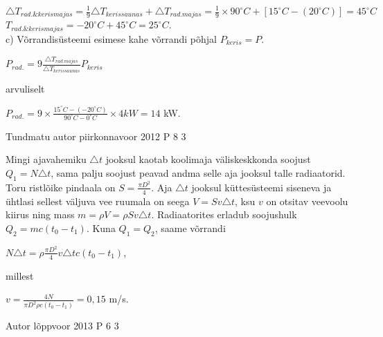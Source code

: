 \documentclass[11pt]{article}
\begin{document}
{{$\triangle T_{rad. \& keris majas} = \frac{1}{9}\triangle T_{keris saunas} + \triangle T_{rad. majas} = \frac{1}{9} \times 90^{\circ} C + [15^{\circ} C - (20 ^{\circ} C)] = 45 ^{\circ} C$ \\

$T_{rad. \& keris majas} = - 20 ^{\circ} C + 45 ^{\circ} C = 25 ^{\circ} C$.
\\
c) Võrrandisüsteemi esimese kahe võrrandi põhjal $P_{keris} = P$.
\begin{center}
$P_{rad.} = 9 \frac{\triangle T_{rad. majas}}{\triangle T_{keris saunas}} P_{keris}$
\end{center}
arvuliselt
\begin{center}
$P_{rad.} = 9 \times \frac{15^{\circ} C - (-20 ^{\circ} C)}{90 ^{\circ} C - 0^{\circ} C} \times 4 kW = 14$ kW.
\end{center}
\fi
}

{Tundmatu autor} %
{piirkonnavoor} %
{2012} %
{P 8} %
{3} %
{

\ifSolution
Mingi ajavahemiku $\triangle t$ jooksul kaotab koolimaja väliskeskkonda soojust $Q_1 = N \triangle t$, sama palju soojust peavad andma selle aja jooksul talle radiaatorid. Toru ristlõike pindaala on $S = \frac{\pi D^2}{4}$. Aja $\triangle t$ jooksul küttesüsteemi siseneva ja ühtlasi sellest väljuva vee ruumala on seega $V = Sv \triangle t$, ksu $v$ on otsitav veevoolu kiirus ning mass $m = \rho V = \rho S v \triangle t$. Radiaatorites erladub soojushulk $Q_2 = mc(t_0 - t_1)$. Kuna $Q_1 = Q_2$, saame võrrandi
\begin{center}
$N \triangle t = \rho \frac{\pi D^2}{4} v \triangle tc (t_0 - t_1)$,
\end{center}
millest
\begin{center}
$v = \frac{4N}{\pi D^2\rho c (t_0 - t_1)} = 0,15$ m/s.
\end{center}
\fi
}

{Autor} %
{lõppvoor} %
{2013} %
{P 6} %
{3} %
{

}}
\end{document}
